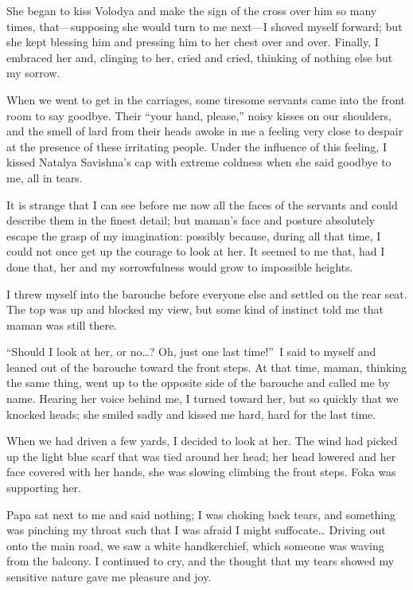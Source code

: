 She began to kiss Volodya and make the sign of the cross over him so many times, that---supposing she would turn to me next---I shoved myself forward; but she kept blessing him and pressing him to her chest over and over. Finally, I embraced her and, clinging to her, cried and cried, thinking of nothing else but my sorrow.

When we went to get in the carriages, some tiresome servants came into the front room to say goodbye. Their ``your hand, please,'' noisy kisses on our shoulders, and the smell of lard from their heads awoke in me a feeling very close to despair at the presence of these irritating people. Under the influence of this feeling, I kissed Natalya Savishna's cap with extreme coldness when she said goodbye to me, all in tears.

It is strange that I can see before me now all the faces of the servants and could describe them in the finest detail; but maman's face and posture absolutely escape the grasp of my imagination: possibly because, during all that time, I could not once get up the courage to look at her. It seemed to me that, had I done that, her and my sorrowfulness would grow to impossible heights.

I threw myself into the barouche before everyone else and settled on the rear seat. The top was up and blocked my view, but some kind of instinct told me that maman was still there.

``Should I look at her, or no\ldots{}? Oh, just one last time!''~I said to myself and leaned out of the barouche toward the front steps. At that time, maman, thinking the same thing, went up to the opposite side of the barouche and called me by name. Hearing her voice behind me, I turned toward her, but so quickly that we knocked heads; she smiled sadly and kissed me hard, hard for the last time.

When we had driven a few yards, I decided to look at her. The wind had picked up the light blue scarf that was tied around her head; her head lowered and her face covered with her hands, she was slowing climbing the front steps. Foka was supporting her.

Papa sat next to me and said nothing; I was choking back tears, and something was pinching my throat such that I was afraid I might suffocate\ldots{} Driving out onto the main road, we saw a white handkerchief, which someone was waving from the balcony. I continued to cry, and the thought that my tears showed my sensitive nature gave me pleasure and joy.

